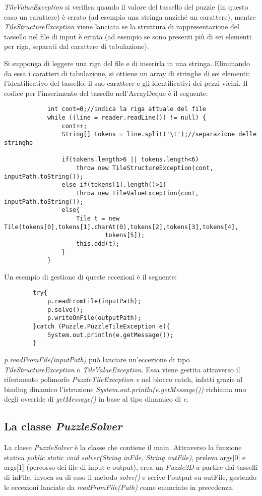 \documentclass{article}
\begin{document}
\textit{TileValueException} si verifica quando il valore del tassello del puzzle (in questo caso un carattere) è errato (ad esempio una stringa anziché un carattere), mentre \textit{TileStructureException} viene lanciata se la struttura di rappresentazione del tassello nel file di input è errata (ad esempio se sono presenti più di sei elementi per riga, separati dal carattere di tabulazione). \par
Si supponga di leggere una riga del file e di inserirla in una stringa. Eliminando da essa i caratteri di tabulazione, si ottiene un array di stringhe di sei elementi: l'identificativo del tassello, il suo carattere e gli identificativi dei pezzi vicini. Il codice per l'inserimento del tassello nell'ArrayDeque è il seguente:
\begin{lstlisting}
			int cont=0;//indica la riga attuale del file
			while ((line = reader.readLine()) != null) {
                cont++;
                String[] tokens = line.split('\t');//separazione delle stringhe 

                if(tokens.length>6 || tokens.length<6)
                    throw new TileStructureException(cont, inputPath.toString());
                else if(tokens[1].length()>1)
                    throw new TileValueException(cont, inputPath.toString());
                else{
                    Tile t = new Tile(tokens[0],tokens[1].charAt(0),tokens[2],tokens[3],tokens[4],
                            tokens[5]);
                    this.add(t);
                }
            }
\end{lstlisting}
Un esempio di gestione di queste eccezioni è il seguente:
\begin{lstlisting}
		try{
            p.readFromFile(inputPath);
            p.solve();
            p.writeOnFile(outputPath);
        }catch (Puzzle.PuzzleTileException e){
            System.out.println(e.getMessage());
        }
\end{lstlisting}
\textit{p.readFromFile(inputPath)} può lanciare un'eccezione di tipo \textit{TileStructureException} o \textit{TileValueException}. Essa viene gestita attraverso il riferimento polimorfo \textit{PuzzleTileException e} nel blocco catch, infatti grazie al binding dinamico l'istruzione \textit{System.out.println(e.getMessage())} richiama uno degli override di \textit{getMessage()} in base al tipo dinamico di \textit{e}.

\subsection{La classe \textit{PuzzleSolver}}
La classe \textit{PuzzleSolver} è la classe che contiene il main. Attraverso la funzione statica \textit{public static void solver(String inFile, String outFile)}, preleva args[0] e args[1] (percorso dei file di input e output), crea un \textit{Puzzle2D} a partire dai tasselli di inFile, invoca su di esso il metodo \textit{solve()} e scrive l'output su outFile, gestendo le eccezioni lanciate da \textit{readFromFile(Path)} come enunciato in precedenza.
\end{document}
